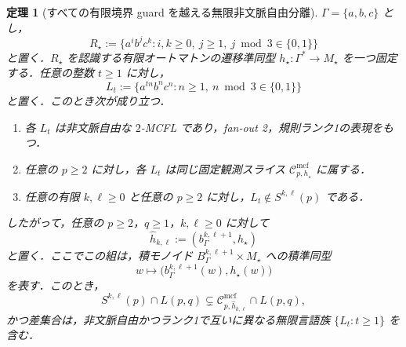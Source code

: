 \documentclass[11pt,a4paper]{ltjsarticle}
\numberwithin{equation}{section}
\theoremstyle{plain}
\newtheorem{theorem}{定理}[section]
\theoremstyle{definition}
\theoremstyle{remark}
\newcommand{\Cmcf}[2]{\mathcal{C}^{\mathrm{mcf}}_{#1,#2}}
\begin{document}
\begin{theorem}[すべての有限境界 guard を越える無限非文脈自由分離]
\label{thm:guarded-infinite-noncfl-separation}
\(\Gamma=\{a,b,c\}\) とし，
\[
 R_\star:=\{a^i b^j c^k:i,k\ge0,\ j\ge1,\ j\bmod3\in\{0,1\}\}
\]
と置く．\(R_\star\) を認識する有限オートマトンの遷移準同型
\(h_\star:\Gamma^*\to M_\star\) を一つ固定する．任意の整数 \(t\ge1\) に対し，
\[
  L_t:=\{a^{tn}b^nc^n:n\ge1,\ n\bmod3\in\{0,1\}\}
\]
と置く．このとき次が成り立つ．
\begin{enumerate}[label=(\roman*),leftmargin=*]
\item 各 \(L_t\) は非文脈自由な \(2\)-MCFL であり，fan-out 2，規則ランク1の表現をもつ．
\item 任意の \(p\ge2\) に対し，各 \(L_t\) は同じ固定観測スライス \(\Cmcf{p}{h_\star}\) に属する．
\item 任意の有限 \(k,\ell\ge0\) と任意の \(p\ge2\) に対し，\(L_t\notin S^{k,\ell}(p)\) である．
\end{enumerate}
したがって，任意の \(p\ge2\)，\(q\ge1\)，\(k,\ell\ge0\) に対して
\[
 \widehat h_{k,\ell}:=(b_\Gamma^{k,\ell+1},h_\star)
\]
と置く．ここでこの組は，積モノイド $B_\Gamma^{k,\ell+1}\times M_\star$ への積準同型
\[
  w\longmapsto\bigl(b_\Gamma^{k,\ell+1}(w),h_\star(w)\bigr)
\]
を表す．このとき，
\[
 S^{k,\ell}(p)\cap L(p,q)
 \subsetneq
 \Cmcf{p}{\widehat h_{k,\ell}}\cap L(p,q),
\]
かつ差集合は，非文脈自由かつランク1で互いに異なる無限言語族
\(\{L_t:t\ge1\}\) を含む．
\end{theorem}
\end{document}
